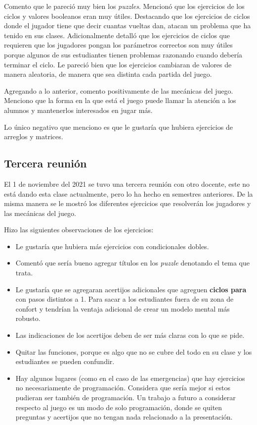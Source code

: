 Comento que le pareció muy bien los \textit{puzzles}. Mencionó que los ejercicios de los ciclos y valores booleanos eran muy útiles. Destacando que los ejercicios de ciclos donde el jugador tiene que decir cuantas vueltas dan, atacan un problema que ha tenido en sus clases. Adicionalmente detalló que los ejercicios de ciclos que requieren que los jugadores pongan los parámetros correctos son muy útiles porque algunos de sus estudiantes tienen problemas razonando cuando debería terminar el ciclo. Le pareció bien que los ejercicios cambiaran de valores de manera aleatoria, de manera que sea distinta cada partida del juego. 

Agregando a lo anterior, comento positivamente de las mecánicas del juego. Menciono que la forma en la que está el juego puede llamar la atención a los alumnos y mantenerlos interesados en jugar más.

Lo único negativo que menciono es que le gustaría que hubiera ejercicios de arreglos y matrices.

\subsection{Tercera reunión}
El 1 de noviembre del 2021 se tuvo una tercera reunión con otro docente, este no está dando esta clase actualmente, pero lo ha hecho en semestres anteriores. De la misma manera se le mostró los diferentes ejercicios que resolverán los jugadores y las mecánicas del juego.

Hizo las siguientes observaciones de los ejercicios:
\begin{itemize}
    \item Le gustaría que hubiera más ejercicios con condicionales dobles.
    \item Comentó que sería bueno agregar títulos en los \textit{puzzle} denotando el tema que trata.
    \item Le gustaría que se agregaran acertijos adicionales que agreguen \textbf{ciclos para} con pasos distintos a 1. Para sacar a los estudiantes fuera de su zona de confort y tendrían la ventaja adicional de crear un modelo mental más robusto.
    \item Las indicaciones de los acertijos deben de ser más claras con lo que se pide.
    \item Quitar las funciones, porque es algo que no se cubre del todo en su clase y los estudiantes se pueden confundir.
    \item Hay algunos lugares (como en el caso de las emergencias) que hay ejercicios no necesariamente de programación. Considera que sería mejor si estos pudieran ser también de programación. Un trabajo a futuro a considerar respecto al juego es un modo de solo programación, donde se quiten preguntas y acertijos que no tengan nada relacionado a la presentación.
\end{itemize}

